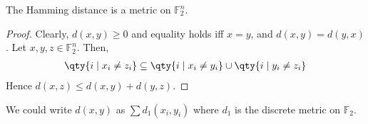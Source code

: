 \begin{lemma}
    The Hamming distance is a metric on $\mathbb F_2^n$.
\end{lemma}
\begin{proof}
    Clearly, $d(x,y) \geq 0$ and equality holds iff $x = y$, and $d(x,y) = d(y,x)$.
    Let $x, y, z \in \mathbb F_2^n$.
    Then,
    \begin{align*}
        \qty{i \mid x_i \neq z_i} \subseteq \qty{i \mid x_i \neq y_i} \cup \qty{i \mid y_i \neq z_i}
    \end{align*}
    Hence $d(x,z) \leq d(x,y) + d(y,z)$.
\end{proof}
\begin{remark}
    We could write $d(x,y)$ as $\sum d_1(x_i,y_i)$ where $d_1$ is the discrete metric on $\mathbb F_2$.
\end{remark}

